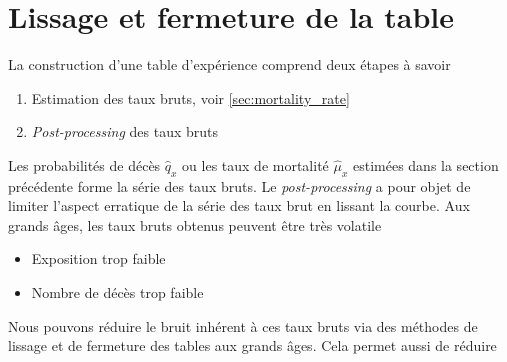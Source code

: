 \section{Lissage et fermeture de la table}
La construction d'une table d'expérience comprend deux étapes à savoir 
\begin{enumerate}
  \item Estimation des taux bruts, voir \cref{sec:mortality_rate}
  \item \textit{Post-processing} des taux bruts
\end{enumerate}
Les probabilités de décès $\widehat{q}_x$ ou les taux de mortalité $\widehat{\mu}_x$ estimées dans la section précédente forme la série des taux bruts. Le \textit{post-processing} a pour objet de limiter l'aspect erratique de la série des taux brut en lissant la courbe. Aux grands âges, les taux bruts obtenus peuvent être très volatile 
\begin{itemize}
  \item Exposition trop faible 
  \item Nombre de décès trop faible 
\end{itemize}
Nous pouvons réduire le bruit inhérent à ces taux bruts via des méthodes de lissage et de fermeture des tables aux grands âges. Cela permet aussi de réduire 
